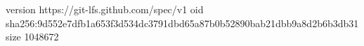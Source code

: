 version https://git-lfs.github.com/spec/v1
oid sha256:9d552e7dfb1a653f3d534dc3791dbd65a87b0b52890bab21dbb9a8d2b6b3db31
size 1048672
